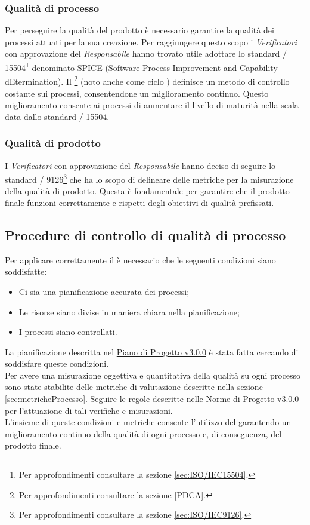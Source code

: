 \documentclass{scalatekids-article}
\begin{document}
\subsubsection{Qualità di processo}
Per perseguire la qualità del prodotto è necessario garantire la qualità dei processi attuati per la sua creazione. Per raggiungere questo scopo i \textit{Verificatori} con approvazione del \textit{Responsabile} hanno trovato utile adottare lo standard / 15504\footnote[1]{Per approfondimenti consultare la sezione \ref{sec:ISO/IEC15504}.} denominato SPICE (Software Process Improvement and Capability dEtermination). Il \footnote[2]{Per approfondimenti consultare la sezione \ref{PDCA}.} (noto anche come ciclo ) definisce un metodo di controllo costante sui processi, consentendone un miglioramento continuo. Questo miglioramento consente ai processi di aumentare il livello di maturità nella scala data dallo standard / 15504.
\subsubsection{Qualità di prodotto}
I \textit{Verificatori} con approvazione del \textit{Responsabile} hanno deciso di seguire lo standard / 9126\footnote[3]{Per approfondimenti consultare la sezione \ref{sec:ISO/IEC9126}.} che ha lo scopo di delineare delle metriche per la misurazione della qualità di prodotto. Questa è fondamentale per garantire che il prodotto  finale funzioni correttamente e rispetti degli obiettivi di qualità prefissati.
\subsection{Procedure di controllo di qualità di processo}
Per applicare correttamente il  è necessario che le seguenti condizioni siano soddisfatte:
\begin{itemize}
\item{Ci sia una pianificazione accurata dei processi;}
\item{Le risorse siano divise in maniera chiara nella pianificazione;}
\item{I processi siano controllati.}
\end{itemize}
La pianificazione descritta nel \href{run:./PianoDiProgetto\_v3.0.0.pdf}{Piano di Progetto v3.0.0} è stata fatta cercando di soddisfare queste condizioni.\\
Per avere una misurazione oggettiva e quantitativa della qualità su ogni processo sono state stabilite delle metriche di valutazione descritte nella sezione \ref{sec:metricheProcesso}. Seguire le regole descritte nelle \href{run:../Interni/NormeDiProgetto\_v3.0.0.pdf}{Norme di Progetto v3.0.0} per l'attuazione di tali verifiche e misurazioni.\\
L'insieme di queste condizioni e metriche consente l'utilizzo del  garantendo un miglioramento continuo della qualità di ogni processo e, di conseguenza, del prodotto finale.
\end{document}
